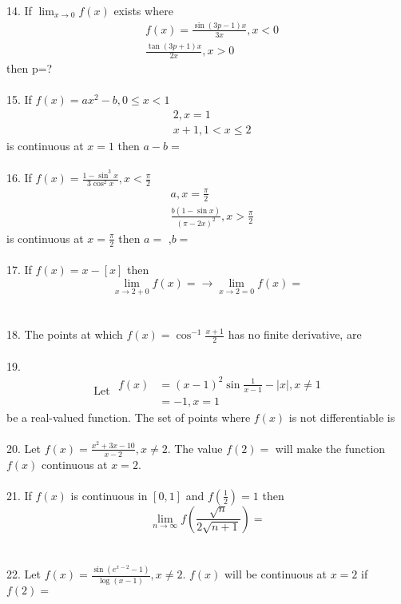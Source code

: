 14. If $\lim _{x \rightarrow 0} f(x)$ exists where
$$
\begin{aligned}
& f(x)= \frac{\sin (3 p-1) x}{3 x}, x<0 \\
& \frac{\tan (3 p+1) x}{2 x}, x>0
\end{aligned}
$$
then p=?
\\\\
15. If $f(x)=a x^2-b, 0 \leq x<1$
$$
\begin{aligned}
& 2, x=1 \\
& x+1,1<x \leq 2
\end{aligned}
$$
is continuous at $x=1$ then $a-b=$\\\\
16. If $f(x)=\frac{1-\sin ^3 x}{3 \cos ^2 x}, x<\frac{\pi}{2}$
$$
\begin{aligned}
& a, x=\frac{\pi}{2} \\
& \frac{b(1-\sin x)}{(\pi-2 x)^2}, x>\frac{\pi}{2}
\end{aligned}
$$
is continuous at $x=\frac{\pi}{2}$ then $a=$ ,$b=$\\\\
17. If $f(x)=x-[x]$ then
$$
\lim _{x \rightarrow 2+0} f(x)=\longrightarrow \lim _{x \rightarrow 2=0} f(x)=
$$\\\\
18. The points at which $f(x)=\cos ^{-1} \frac{x+1}{2}$ has no finite derivative, are\\\\
19.
$$
\text { Let } \begin{aligned}
f(x) & =(x-1)^2 \sin \frac{1}{x-1}-|x|, x \neq 1 \\
& =-1, x=1
\end{aligned}
$$
be a real-valued function. The set of points where $f(x)$ is not differentiable is\\\\
20. Let $f(x)=\frac{x^2+3 x-10}{x-2}, x \neq 2$.
The value $f(2)=$ will make the function $f(x)$ continuous at $x=2$.\\\\
21. If $f(x)$ is continuous in $[0,1]$ and $f\left(\frac{1}{2}\right)=1$ then
$$
\lim _{n \rightarrow \infty} f\left(\frac{\sqrt{n}}{2 \sqrt{n+1}}\right)=
$$\\\\
22. Let $f(x)=\frac{\sin \left(e^{x-2}-1\right)}{\log (x-1)}, x \neq 2$.
$f(x)$ will be continuous at $x=2$ if $f(2)=$